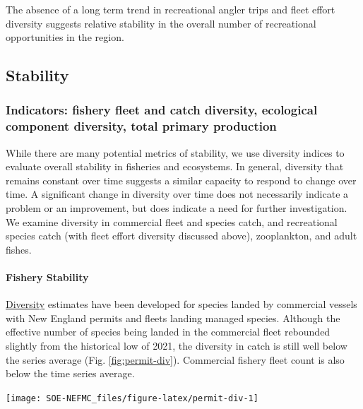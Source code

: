 \documentclass[
  10pt,
]{article}
\let\origfigure\figure
\let\endorigfigure\endfigure
\renewenvironment{figure}[1][2] {
    \expandafter\origfigure\expandafter[H]
} {
    \endorigfigure
}
\begin{document}
The absence of a long term trend in recreational angler trips and fleet effort diversity suggests relative stability in the overall number of recreational opportunities in the region.

\hypertarget{stability}{%
\subsection{Stability}\label{stability}}

\hypertarget{indicators-fishery-fleet-and-catch-diversity-ecological-component-diversity-total-primary-production}{%
\subsubsection{Indicators: fishery fleet and catch diversity, ecological component diversity, total primary production}\label{indicators-fishery-fleet-and-catch-diversity-ecological-component-diversity-total-primary-production}}

While there are many potential metrics of stability, we use diversity indices to evaluate overall stability in fisheries and ecosystems. In general, diversity that remains constant over time suggests a similar capacity to respond to change over time. A significant change in diversity over time does not necessarily indicate a problem or an improvement, but does indicate a need for further investigation. We examine diversity in commercial fleet and species catch, and recreational species catch (with fleet effort diversity discussed above), zooplankton, and adult fishes.

\hypertarget{fishery-stability}{%
\paragraph{Fishery Stability}\label{fishery-stability}}

\href{https://noaa-edab.github.io/catalog/commercial-catch-and-fleet-diversity.html}{Diversity} estimates have been developed for species landed by commercial vessels with New England permits and fleets landing managed species. Although the effective number of species being landed in the commercial fleet rebounded slightly from the historical low of 2021, the diversity in catch is still well below the series average (Fig. \ref{fig:permit-div}). Commercial fishery fleet count is also below the time series average.

\begin{figure}

{\centering \texttt{[image: SOE-NEFMC\_files/figure-latex/permit-div-1]} 

}

\caption{Species revenue diversity in New England.}\label{fig:permit-div}
\end{figure}
\end{document}

